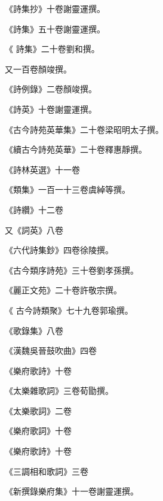 \begin{pinyinscope}
 《詩集抄》十卷謝靈運撰。



 《詩集》五十卷謝靈運撰。



 《
 詩集》二十卷劉和撰。



 又一百卷顏竣撰。



 《詩例錄》二卷顏竣撰。



 《詩英》十卷謝靈運撰。



 《古今詩苑英華集》二十卷梁昭明太子撰。



 《續古今詩苑英華》二十卷釋惠靜撰。



 《詩林英選》十一卷



 《類集》一百一十三卷虞綽等撰。



 《詩纘》十二卷



 又《詞英》八卷



 《六代詩集鈔》四卷徐陵撰。



 《古今類序詩苑》三十卷劉孝孫撰。



 《麗正文苑》二十卷許敬宗撰。



 《
 古今詩類聚》七十九卷郭瑜撰。



 《歌錄集》八卷



 《漢魏吳晉鼓吹曲》四卷



 《樂府歌詩》十卷



 《太樂雜歌詞》三卷荀勖撰。



 《太樂歌詞》二卷



 《樂府歌詞》十卷



 《樂府歌詩》十卷



 《三調相和歌詞》三卷



 《新撰錄樂府集》十一卷謝靈運撰。




\end{pinyinscope}
